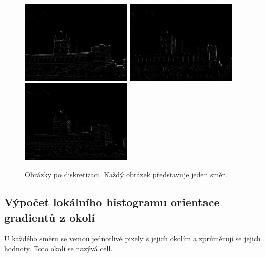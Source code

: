 \documentclass{report}
\begin{document}
\begin{figure}[H]
	\centering
	\includegraphics[width=150pt]{./img/directional0.jpg}
	\includegraphics[width=150pt]{./img/directional1.jpg}
	\includegraphics[width=150pt]{./img/directional2.jpg}
	\caption{Obrázky po diskretizaci. Každý obrázek představuje jeden směr.}
\end{figure}


\subsection{Výpočet lokálního histogramu orientace gradientů z okolí}
U každého směru  se vemou jednotlivé pixely s jejich okolím a zprůměrují se jejich hodnoty. Toto okolí se nazývá cell. \\
\end{document}
